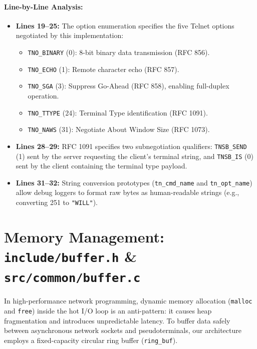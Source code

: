 \paragraph{Line-by-Line Analysis:}
\begin{itemize}[leftmargin=1.5em]
    \item \textbf{Lines 19--25:} The option enumeration specifies the five Telnet options negotiated by this implementation:
    \begin{itemize}
        \item \texttt{TNO\_BINARY} (0): 8-bit binary data transmission (RFC 856).
        \item \texttt{TNO\_ECHO} (1): Remote character echo (RFC 857).
        \item \texttt{TNO\_SGA} (3): Suppress Go-Ahead (RFC 858), enabling full-duplex operation.
        \item \texttt{TNO\_TTYPE} (24): Terminal Type identification (RFC 1091).
        \item \texttt{TNO\_NAWS} (31): Negotiate About Window Size (RFC 1073).
    \end{itemize}
    \item \textbf{Lines 28--29:} RFC 1091 specifies two subnegotiation qualifiers: \texttt{TNSB\_SEND} (1) sent by the server requesting the client's terminal string, and \texttt{TNSB\_IS} (0) sent by the client containing the terminal type payload.
    \item \textbf{Lines 31--32:} String conversion prototypes (\texttt{tn\_cmd\_name} and \texttt{tn\_opt\_name}) allow debug loggers to format raw bytes as human-readable strings (e.g., converting 251 to \texttt{"WILL"}).
\end{itemize}

\section{Memory Management: \texttt{include/buffer.h} \& \texttt{src/common/buffer.c}}

In high-performance network programming, dynamic memory allocation (\texttt{malloc} and \texttt{free}) inside the hot I/O loop is an anti-pattern: it causes heap fragmentation and introduces unpredictable latency. To buffer data safely between asynchronous network sockets and pseudoterminals, our architecture employs a fixed-capacity circular ring buffer (\texttt{ring\_buf}).

